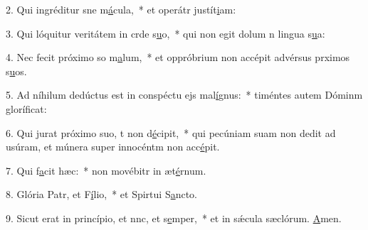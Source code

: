 2. Qui ingréditur sne m\uline{á}cula,~* et operátr justít\uline{i}am:\par 
3. Qui lóquitur veritátem in crde s\uline{u}o,~* qui non egit dolum n lingua s\uline{u}a:\par 
4. Nec fecit próximo so m\uline{a}lum,~* et oppróbrium non accépit advérsus prximos s\uline{u}os.\par 
5. Ad níhilum dedúctus est in conspéctu ejs mal\uline{í}gnus:~* timéntes autem Dóminm gloríf\uline{i}cat:\par 
6. Qui jurat próximo suo, t non d\uline{é}cipit,~* qui pecúniam suam non dedit ad usúram, et múnera super innocéntm non acc\uline{é}pit.\par 
7. Qui f\uline{a}cit hæc:~* non movébitr in æt\uline{é}rnum.\par 
8. Glória Patr, et F\uline{í}lio,~* et Spirtui S\uline{a}ncto.\par 
9. Sicut erat in princípio, et nnc, et s\uline{e}mper,~* et in sǽcula sæclórum. \uline{A}men.\par 
